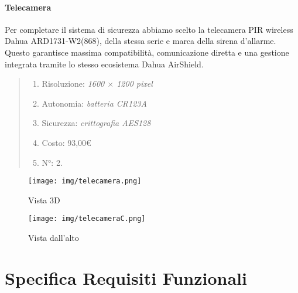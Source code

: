 \documentclass[italian, 12pt, a4paper]{article}
\begin{document}
\paragraph{Telecamera}
Per completare il sistema di sicurezza abbiamo scelto la telecamera PIR wireless Dahua ARD1731-W2(868), della stessa serie e marca della sirena d'allarme. Questo garantisce massima compatibilità, comunicazione diretta e una gestione integrata tramite lo stesso ecosistema Dahua AirShield.
\begin{quote}
    \begin{enumerate}
        \item Risoluzione: \emph{1600 $\times$ 1200 pixel}
        \item Autonomia: \emph{batteria CR123A}
        \item Sicurezza: \emph{crittografia AES128}
        \item Costo: 93,00€
        \item N°: 2.
    \end{enumerate}
\end{quote}
\begin{figure}[h]
    \centering
    \begin{minipage}{0.45\textwidth}
        \centering
        \texttt{[image: img/telecamera.png]}
        \caption{Vista 3D}
    \end{minipage} \hfill
    \begin{minipage}{0.45\textwidth}
        \centering
        \texttt{[image: img/telecameraC.png]}
        \caption{Vista dall'alto}
    \end{minipage}
\end{figure}

\clearpage
\section{Specifica Requisiti Funzionali}\label{sec:requisiti2}
\end{document}
